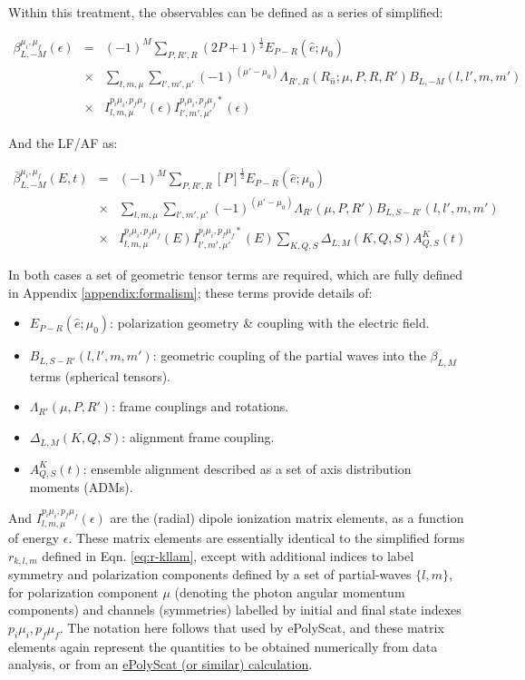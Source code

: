 Within this treatment, the observables can be defined as a series of simplified:

\begin{eqnarray}
\beta_{L,-M}^{\mu_{i},\mu_{f}}(\epsilon) & = & (-1)^{M}\sum_{P,R',R}(2P+1)^{\frac{1}{2}}{E_{P-R}(\hat{e};\mu_{0})}\\
 & \times &\sum_{l,m,\mu}\sum_{l',m',\mu'}(-1)^{(\mu'-\mu_{0})}{\Lambda_{R',R}(R_{\hat{n}};\mu,P,R,R')B_{L,-M}(l,l',m,m')}\\
 & \times & I_{l,m,\mu}^{p_{i}\mu_{i},p_{f}\mu_{f}}(\epsilon)I_{l',m',\mu'}^{p_{i}\mu_{i},p_{f}\mu_{f}*}(\epsilon)\label{eq:BLM-tensor-MF}
\end{eqnarray}

And the LF/AF as:

\begin{eqnarray}
\bar{\beta}_{L,-M}^{\mu_{i},\mu_{f}}(E,t) & = & (-1)^{M}\sum_{P,R',R}{[P]^{\frac{1}{2}}}{E_{P-R}(\hat{e};\mu_{0})}\\
 & \times &\sum_{l,m,\mu}\sum_{l',m',\mu'}(-1)^{(\mu'-\mu_{0})}{\Lambda_{R'}(\mu,P,R')B_{L,S-R'}(l,l',m,m')}\\
 & \times &I_{l,m,\mu}^{p_{i}\mu_{i},p_{f}\mu_{f}}(E)I_{l',m',\mu'}^{p_{i}\mu_{i},p_{f}\mu_{f}*}(E)\sum_{K,Q,S}\Delta_{L,M}(K,Q,S)A_{Q,S}^{K}(t)\label{eq:BLM-tensor-AF}
\end{eqnarray}

In both cases a set of geometric tensor terms are required, which are fully defined in Appendix \ref{appendix:formalism}; these terms provide details of:

\begin{itemize}
\item ${E_{P-R}(\hat{e};\mu_{0})}$: polarization geometry \& coupling with the electric field.
\item $B_{L,S-R'}(l,l',m,m')$: geometric coupling of the partial waves into the $\beta_{L,M}$ terms (spherical tensors).
\item $\Lambda_{R'}(\mu,P,R')$: frame couplings and rotations.
\item $\Delta_{L,M}(K,Q,S)$: alignment frame coupling.
\item $A_{Q,S}^{K}(t)$: ensemble alignment described as a set of axis distribution moments (ADMs).
\end{itemize}

And \(I_{l,m,\mu}^{p_{i}\mu_{i},p_{f}\mu_{f}}(\epsilon)\) are the (radial) dipole ionization matrix elements, as a function of energy \(\epsilon\). These matrix elements are essentially identical to the simplified forms $r_{k,l,m}$ defined in Eqn. \ref{eq:r-kllam}, except with additional indices to label symmetry and polarization components
defined by a set of partial-waves \(\{l,m\}\), for polarization component \(\mu\) (denoting the photon angular momentum components) and channels (symmetries) labelled by initial and final state indexes \({p_{i}\mu_{i},p_{f}\mu_{f}}\). The notation here follows that used by ePolyScat, and these matrix elements again represent the quantities  to be obtained numerically from data analysis, or from an \href{https://epsproc.readthedocs.io/en/latest/ePS_ePSproc_tutorial/ePS_tutorial_080520.html\#Theoretical-background}{ePolyScat (or similar) calculation}. 

